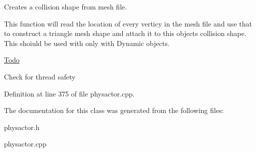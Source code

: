 Creates a collision shape from mesh file. 

This function will read the location of every verticy in the mesh file and use that to construct a triangle mesh shape and attach it to this objects collision shape. This shoiuld be used with only with Dynamic objects. 

\begin{Desc}
\item[\hyperlink{todo__todo000012}{Todo}]
\begin{DoxyItemize}
\item Check for thread safety 
\end{DoxyItemize}\end{Desc}




Definition at line 375 of file physactor.cpp.



The documentation for this class was generated from the following files:\begin{DoxyCompactItemize}
\item 
physactor.h\item 
physactor.cpp\end{DoxyCompactItemize}
